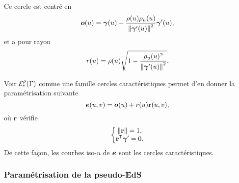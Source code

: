Ce cercle est centré en
\begin{equation}
    \bm{o}(u) = \bm{\gamma}(u) - \frac{\rho(u)\rho_u(u)}{\left\| {\bm{\gamma}'(u)} \right\|^2} \bm{\gamma}'(u),
    \label{eq:cercle_caracteristique_centre}
\end{equation}
et a pour rayon
\begin{equation}
    r(u) = \rho(u) \sqrt{1 - \frac{\rho_u(u)^2}{\left\| {\bm{\gamma}'(u)} \right\|^2}}.
    \label{eq:cercle_caracteristique_rayon}
\end{equation}
\par
Voir ${\mathcal{E}}_{*}^{\rho}({\Gamma})$ comme une famille cercles caractéristiques permet d'en donner la paramétrisation suivante
\begin{equation}
    \bm{e}(u,v) = \bm{o}(u) + r(u)\mathbf{r}(u,v),
    \label{eq:parametrisation_EdS_propre_courbe}
\end{equation}
où $\mathbf{r}$ vérifie
\begin{equation}
	\left\{
		\begin{matrix}
			\left\| {\mathbf{r}} \right\| = 1,\\ 
			{\mathbf{r}} ^\mathsf{T} {\bm{\gamma}'} = 0.
		\end{matrix}
	\right.
	\label{eq:parametrisation_EdS_propre_courbe_condition_r}
\end{equation}
De cette façon, les courbes iso-$u$ de $\bm{e}$ sont les cercles caractéristiques.


\subsubsection{Paramétrisation de la pseudo-EdS}
\label{section:parametrisation_pseudo_EdS_arete}



